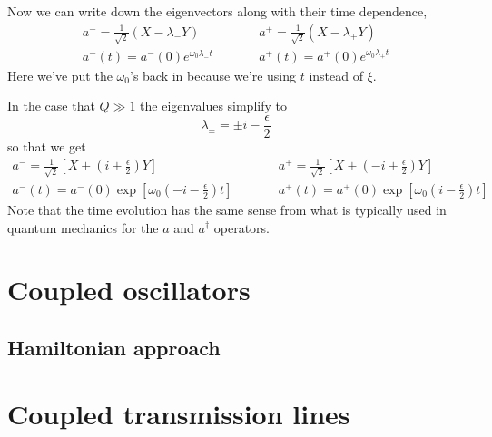 \documentclass{article}
\begin{document}
Now we can write down the eigenvectors along with their time dependence, \begin{eqnarray}
a^- = \frac{1}{\sqrt{2}}\left( X -\lambda_- Y \right) &\qquad&
a^+ = \frac{1}{\sqrt{2}}\left( X -\lambda_+ Y \right) \\
a^-(t) = a^-(0) e^{\omega_0 \lambda_- t} &\qquad& a^+(t) = a^+(0) e^{\omega_0 \lambda_+ t} \end{eqnarray}
Here we've put the $\omega_0$'s back in because we're using $t$ instead of $\xi$.

In the case that $Q \gg 1$ the eigenvalues simplify to \begin{equation}
\lambda_{\pm} = \pm i -\frac{\epsilon}{2} \end{equation}
so that we get \begin{eqnarray}
a^- = \frac{1}{\sqrt{2}}\left[ X + \left( i + \frac{\epsilon}{2} \right) Y \right] &\qquad&
a^+ = \frac{1}{\sqrt{2}}\left[ X + \left(-i + \frac{\epsilon}{2} \right) Y \right] \\
a^-(t) = a^-(0) \exp \left[ \omega_0 \left(-i - \frac{\epsilon}{2}\right) t \right]
& \qquad &
a^+(t) = a^+(0) \exp \left[ \omega_0 \left( i - \frac{\epsilon}{2}\right) t \right] \end{eqnarray}
Note that the time evolution has the same sense from what is typically used in quantum mechanics for the $a$ and $a^{\dagger}$ operators.

\section{Coupled oscillators}



\subsection{Hamiltonian approach}



\section{Coupled transmission lines}


\end{document}
